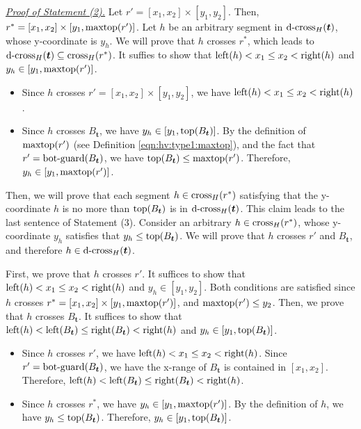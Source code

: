 \noindent \underline{\em Proof of Statement (2).} 
Let $r' = [x_1,x_2] \times [y_1,y_2]$. Then, $r^* = [x_1,x_2]\times [y_1, \mathrm{maxtop}(r')]$. Let $h$ be an arbitrary segment in $\mathrm{d\text{-}cross}_H(\textrm{\boldmath${t}$})$, whose y-coordinate is $y_h$.  We will prove that $h$ crosses $r^*$, which leads to $\mathrm{d\text{-}cross}_H(\textrm{\boldmath${t}$})\subseteq \mathrm{cross}_H(r^*)$. It suffies to show that $\mathrm{left}(h) < x_1 \le x_2 < \mathrm{right}(h)$ and $y_h \in [y_1, \mathrm{maxtop}(r')]$. 
\begin{itemize}
    \item Since $h$ crosses $r' = [x_1,x_2]\times [y_1,y_2]$, we have $\mathrm{left}(h) < x_1 \le x_2 < \mathrm{right}(h)$.
    \item Since $h$ crosses $B_{\bm{t}}$, we have $y_h \in [y_1, \mathrm{top}(B_{\textrm{\boldmath${t}$}})]$. By the definition of $\mathrm{maxtop}(r')$ (see Definition \eqref{eqn:hv:type1:maxtop}), and the fact that $r' = \mathrm{bot\text{-}guard}(B_{\textrm{\boldmath${t}$}})$, we have $\mathrm{top}(B_{\textrm{\boldmath${t}$}}) \leq \mathrm{maxtop}(r')$. Therefore, $y_h \in [y_1, \mathrm{maxtop}(r')]$.
\end{itemize}

\vgap 

Then, we will prove that each segment $h \in \mathrm{cross}_H(r^*)$ satisfying that the y-coordinate $h$ is no more than $\mathrm{top}(B_{\textrm{\boldmath${t}$}})$ is in $\mathrm{d\text{-}cross}_H(\textrm{\boldmath${t}$})$. This claim leads to the last sentence of Statement (3). Consider an arbitrary $h\in \mathrm{cross}_H(r^*)$, whose y-coordinate $y_h$ satisfies that $y_h \le \mathrm{top}(B_{\textrm{\boldmath${t}$}})$. We will prove that $h$ crosses $r'$ and $B_{\bm{t}}$, and therefore $h \in \mathrm{d\text{-}cross}_H(\textrm{\boldmath${t}$})$.

\vgap 

First, we prove that $h$ crosses $r'$. It suffices to show that $\mathrm{left}(h)  < x_1 \leq x_2 < \mathrm{right}(h)$ and $y_h \in [y_1, y_2]$. Both conditions are satisfied since $h$ crosses $r^* = [x_1,x_2]\times [y_1, \mathrm{maxtop}(r')]$, and $\mathrm{maxtop}(r')\leq y_2$. Then, we prove that $h$ crosses $B_{\bm{t}}$. It suffices to show that $\mathrm{left}(h) < \mathrm{left}(B_{\textrm{\boldmath${t}$}}) \le \mathrm{right}(B_{\textrm{\boldmath${t}$}}) < \mathrm{right}(h)$ and $y_h \in [y_1, \mathrm{top}(B_{\textrm{\boldmath${t}$}})]$.
\begin{itemize}
    \item Since $h$ crosses $r'$, we have $\mathrm{left}(h) < x_1 \leq x_2 < \mathrm{right}(h)$. Since $r' = \mathrm{bot\text{-}guard}(B_{\textrm{\boldmath${t}$}})$, we have the x-range of $B_{\bm{t}}$ is contained in $[x_1,x_2]$. Therefore, $\mathrm{left}(h) < \mathrm{left}(B_{\textrm{\boldmath${t}$}}) \le \mathrm{right}(B_{\textrm{\boldmath${t}$}}) < \mathrm{right}(h)$.
    \item Since $h$ crosses $r^*$, we have $y_h \in [y_1, \mathrm{maxtop}(r')]$. By the definition of $h$, we have $y_h \leq \mathrm{top}(B_{\textrm{\boldmath${t}$}})$. Therefore, $y_h \in [y_1, \mathrm{top}(B_{\textrm{\boldmath${t}$}})]$. 
\end{itemize}
